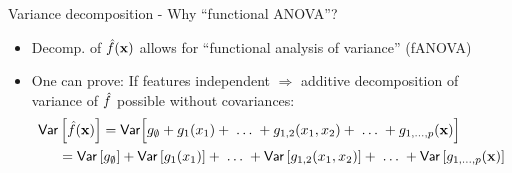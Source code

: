 \documentclass[10pt,compress,t,notes=noshow, xcolor=table]{beamer}
\newcommand{\open}{}
\newcommand{\close}{}
\begin{document}
\begin{frame}{Variance decomposition - Why ``functional ANOVA''?
}

\begin{itemize}[<+->]
\item Decomp. of $\hat{f}(\mathbf{x})$ allows for ``functional analysis of variance'' (fANOVA)
\item One can prove: 
If features independent $\Rightarrow$ additive decomposition of variance of $\hat{f}$ possible without covariances:
\begin{align*}
\var & \left[ \hat{f}(\xv) \right]
 =  \var \Big[g_{\open \emptyset \close} + g_{\open 1 \close}(x_1) + \;\dots\; + g_{\open 1, 2 \close}(x_1, x_2) + \;\dots\; + g_{\open 1,\ldots,p \close}(\xv) \Big] \\
& = \var\left[g_{\open \emptyset \close}\right]
    + \var\left[g_{\open 1 \close}(x_1)\right] + \;\dots\; 
    + \var\left[g_{\open 1, 2 \close}(x_1, x_2)\right] + \;\dots\;
    + \var\left[g_{\open 1,\ldots,p \close}(\xv)\right]
\end{align*}


\end{itemize}
\end{frame}
\end{document}
